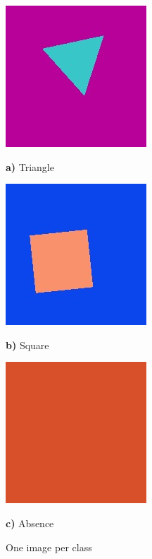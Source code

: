 \documentclass[a4paper,11pt]{report}
\theoremstyle{definition}
\theoremstyle{plain}
\begin{document}
                \begin{figure}[H]
                    \centering
                
                    \begin{minipage}{0.2\textwidth}
                        \centering
                        \includegraphics[scale=0.15]{images/data3.jpeg}
                        \caption*{\textbf{a)} Triangle}
                    \end{minipage}
                    \hfill
                    \begin{minipage}{0.2\textwidth}
                        \centering
                        \includegraphics[scale=0.15]{images/data2.jpeg}
                        \caption*{\textbf{b)} Square}
                    \end{minipage}
                    \hfill
                    \begin{minipage}{0.2\textwidth}
                        \centering
                        \includegraphics[scale=0.15]{images/data1.jpeg}
                        \caption*{\textbf{c)} Absence}
                    \end{minipage}
                
                    \caption{One image per class}
                \end{figure}
            
\end{document}
